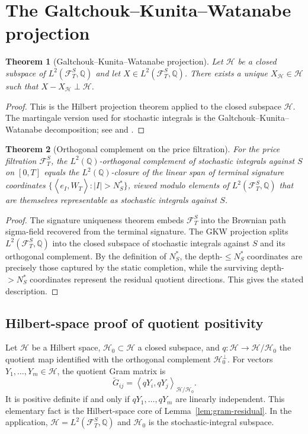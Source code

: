 \documentclass[11pt,oneside]{article}
\theoremstyle{plain}
\newtheorem{theorem}{Theorem}[section]
\theoremstyle{definition}
\theoremstyle{remark}
\newcommand{\Q}{\mathbb{Q}}
\newcommand{\cW}{\widehat W}
\newcommand{\FS}{\mathcal F^S}
\newcommand{\inner}[2]{\left\langle #1,#2\right\rangle}
\begin{document}
\section{The Galtchouk--Kunita--Watanabe projection}\label{app:gkw}

\begin{theorem}[Galtchouk--Kunita--Watanabe projection]
Let $\mathcal H$ be a closed subspace of $L^2(\FS_T,\Q)$ and let $X\in L^2(\FS_T,\Q)$. There exists a unique $X_{\mathcal H}\in\mathcal H$ such that $X-X_{\mathcal H}\perp\mathcal H$.
\end{theorem}

\begin{proof}
This is the Hilbert projection theorem applied to the closed subspace $\mathcal H$. The martingale version used for stochastic integrals is the Galtchouk--Kunita--Watanabe decomposition; see \citet{KunitaWatanabe1967} and \citet{FoellmerSchweizer1991}.
\end{proof}

\begin{theorem}[Orthogonal complement on the price filtration]\label{thm:ortho-complement}
For the price filtration $\FS_T$, the $L^2(\Q)$-orthogonal complement of stochastic integrals against $S$ on $[0,T]$ equals the $L^2(\Q)$-closure of the linear span of terminal signature coordinates $\{\inner{e_I}{\cW_T}: |I|>N^\ast_S\}$, viewed modulo elements of $L^2(\FS_T,\Q)$ that are themselves representable as stochastic integrals against $S$.
\end{theorem}

\begin{proof}
The signature uniqueness theorem embeds $\FS_T$ into the Brownian path sigma-field recovered from the terminal signature. The GKW projection splits $L^2(\FS_T,\Q)$ into the closed subspace of stochastic integrals against $S$ and its orthogonal complement. By the definition of $N^\ast_S$, the depth-$\leq N^\ast_S$ coordinates are precisely those captured by the static completion, while the surviving depth-$>N^\ast_S$ coordinates represent the residual quotient directions. This gives the stated description.
\end{proof}



\subsection*{Hilbert-space proof of quotient positivity}
Let $\mathcal H$ be a Hilbert space, $\mathcal H_0\subset\mathcal H$ a closed subspace, and $q:\mathcal H\to\mathcal H/\mathcal H_0$ the quotient map identified with the orthogonal complement $\mathcal H_0^\perp$. For vectors $Y_1,\ldots,Y_m\in\mathcal H$, the quotient Gram matrix is
\[
\widetilde G_{ij}=\inner{qY_i}{qY_j}_{\mathcal H/\mathcal H_0}.
\]
It is positive definite if and only if $qY_1,\ldots,qY_m$ are linearly independent. This elementary fact is the Hilbert-space core of Lemma~\ref{lem:gram-residual}. In the application, $\mathcal H=L^2(\FS_T,\Q)$ and $\mathcal H_0$ is the stochastic-integral subspace.
\end{document}
